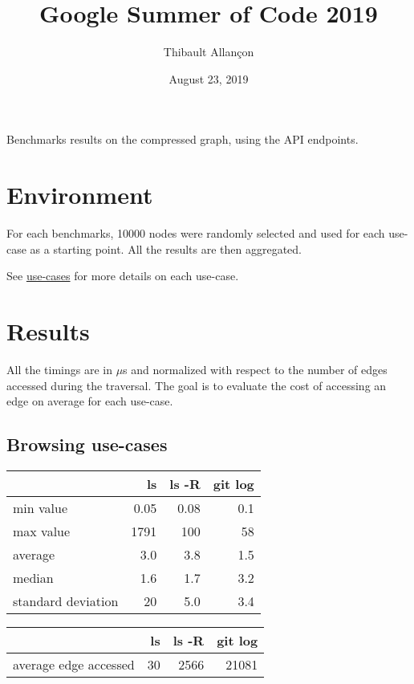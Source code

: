 \documentclass[11pt,a4paper]{article}
\title{Google Summer of Code 2019}
\author{Thibault Allançon}
\date{August 23, 2019}
\begin{document}
\maketitle

Benchmarks results on the compressed graph, using the API endpoints.

\section{Environment}

For each benchmarks, 10000 nodes were randomly selected and used for each
use-case as a starting point. All the results are then aggregated.

See
\href{https://docs.softwareheritage.org/devel/swh-graph/use-cases.html}{use-cases}
for more details on each use-case.

\section{Results}

All the timings are in $\mu$s and normalized with respect to the number of edges
accessed during the traversal. The goal is to evaluate the cost of accessing an
edge on average for each use-case.

\subsection{Browsing use-cases}

\begin{center}
    \begin{tabular}{@{} l *3r @{}}
        \toprule
        \multicolumn{1}{c}{} &
            \textbf{ls} &
            \textbf{ls -R} &
            \textbf{git log} \\
        \midrule
        min value & 0.05 & 0.08 & 0.1 \\
        max value & 1791 & 100  & 58 \\
        average & 3.0 & 3.8 & 1.5 \\
        median & 1.6 & 1.7 & 3.2 \\
        standard deviation & 20 & 5.0 & 3.4 \\
        \bottomrule
    \end{tabular}
\end{center}

\vspace{0.5cm}

\begin{center}
    \begin{tabular}{@{} l *3r @{}}
        \toprule
        \multicolumn{1}{c}{} &
            \textbf{ls} &
            \textbf{ls -R} &
            \textbf{git log} \\
        \midrule
        average edge accessed & 30 & 2566 & 21081 \\
        \bottomrule
    \end{tabular}
\end{center}
\end{document}
